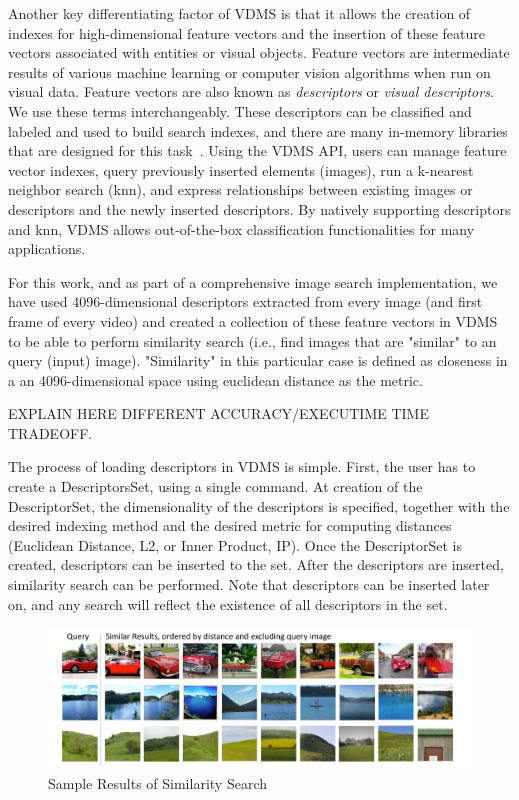 Another key differentiating factor of VDMS is that it allows the creation of
indexes for high-dimensional feature vectors and the insertion of
these feature vectors associated with entities or visual objects.
Feature vectors are intermediate results of various machine
learning or computer vision algorithms when run on visual data.
Feature vectors are also known as \textit{descriptors}
or \textit{visual descriptors}. We use these terms interchangeably.
These descriptors can be classified and labeled and used to build search indexes,
and there are many in-memory libraries that are designed for
this task~\cite{flann, faiss}.
Using the VDMS API, users can manage feature vector indexes,
query previously inserted elements (images),
run a k-nearest neighbor search (knn), and express relationships
between existing images or descriptors and
the newly inserted descriptors.
By natively supporting descriptors and knn,
VDMS allows out-of-the-box classification functionalities for many applications.

For this work, and as part of a comprehensive image search implementation,
we have used 4096-dimensional descriptors extracted from every image
(and first frame of every video) and created a collection of these feature
vectors in VDMS to be able to perform similarity search (i.e., find
images that are "similar" to an query (input) image).
"Similarity" in this particular case is defined as closeness
in a an 4096-dimensional space using euclidean distance as the metric.

EXPLAIN HERE DIFFERENT ACCURACY/EXECUTIME TIME TRADEOFF.

The process of loading descriptors in VDMS is simple.
First, the user has to create a DescriptorsSet, using a single command.
At creation of the DescriptorSet, the dimensionality of the descriptors
is specified, together with the desired indexing method and the desired metric
for computing distances (Euclidean Distance, L2, or Inner Product, IP).
Once the DescriptorSet is created, descriptors can be inserted to the set.
After the descriptors are inserted, similarity search can be performed.
Note that descriptors can be inserted later on, and any search will reflect
the existence of all descriptors in the set.

\begin{figure}[]
\centering
\includegraphics[width=\textwidth]{figures/feature_img_results}
\caption{Sample Results of Similarity Search}
\label{fig:similarity}
\end{figure}

